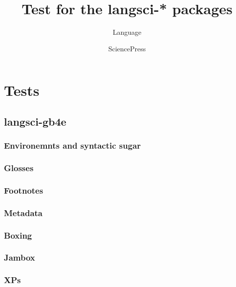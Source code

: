 \documentclass[output=book
	      ,nonflat
	      ,modfonts,
	      ,colorlinks
	      ,biblatex
	      ]{langsci/langscibook}
\title{Test for the langsci-* packages}
\author{Language\and Science\lastand Press}
\begin{document}
\maketitle 
\tableofcontents

\chapter{Tests} 
\section{langsci-gb4e}
\subsection{Environemnts and syntactic sugar}









 
\subsection{Glosses}





 
\subsection{Footnotes}


 
\subsection{Metadata}

\subsection{Boxing}

% 
\subsection{Jambox}

\subsection{XPs}


  
\end{document}

